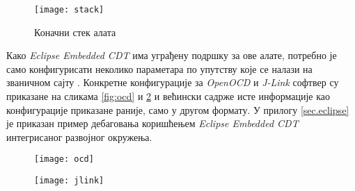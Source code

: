 \begin{figure}[h!]
	\centering
	\texttt{[image: stack]}
	\caption{Коначни стек алата}
	\label{fig:stack}
\end{figure}\newpage

Како \textit{Eclipse Embedded CDT} има уграђену подршку за ове алате, потребно је само конфигурисати неколико параметара по упутству које се налази на званичном сајту \cite{embcdt}.
Конкретне конфигурације за \textit{Open\acrshort{OCD}} и \textit{J-Link} софтвер су приказане на сликама \ref{fig:ocd} и \ref{fig:jlink} и већински садрже исте информације као конфигурације приказане раније, само у другом формату. У прилогу \ref{sec.eclipse} је приказан пример дебаговања коришћењем \textit{Eclipse Embedded CDT} интегрисаног развојног окружења.

\begin{figure}
	\centering
	\begin{minipage}{.5\textwidth}
		\centering
		\texttt{[image: ocd]}
		\label{fig:ocd}
	\end{minipage}%
	\begin{minipage}{.5\textwidth}
		\centering
		\texttt{[image: jlink]}
		\label{fig:jlink}
	\end{minipage}
\end{figure}

